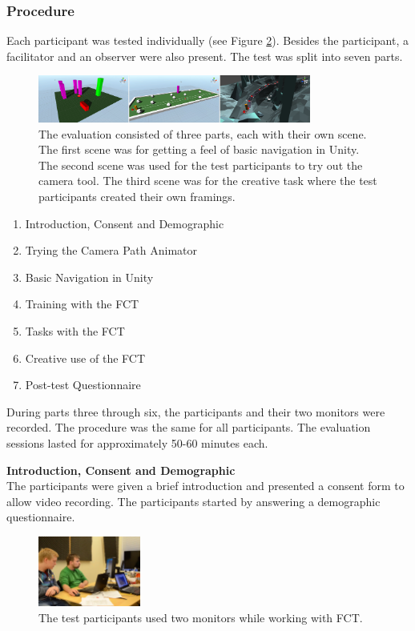 \subsubsection{Procedure}
Each participant was tested individually (see Figure \ref{fig:tt}). Besides the participant, a facilitator and an observer were also present. The test was split into seven parts. 
\begin{figure}[hbtp]
\centering
\includegraphics[width=0.8\textwidth]{Pics/sceneAll_horizontal}
\caption{The evaluation consisted of three parts, each with their own scene. The first scene was for getting a feel of basic navigation in Unity. The second scene was used for the test participants to try out the camera tool. The third scene was for the creative task where the test participants created their own framings.}
\label{fig:sceneAll}
\end{figure}

\begin{enumerate}
\item Introduction, Consent and Demographic
\item Trying the Camera Path Animator
\item Basic Navigation in Unity
\item Training with the FCT
\item Tasks with the FCT
\item Creative use of the FCT
\item Post-test Questionnaire
\end{enumerate}

During parts three through six, the participants and their two monitors were recorded. The procedure was the same for all participants. The evaluation sessions lasted for approximately 50-60 minutes each. 

\textbf{Introduction, Consent and Demographic}\\
The participants were given a brief introduction and presented a consent form to allow video recording. The participants started by answering a demographic questionnaire. 

\begin{figure}[htbp]
\centering
\includegraphics[width=0.3\textwidth]{Pics/test_setup}
\caption{The test participants used two monitors while working with FCT.}
\label{fig:tt}
\end{figure}

